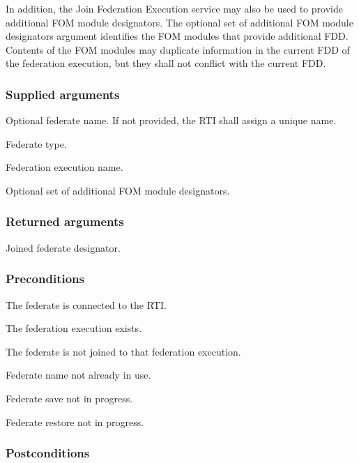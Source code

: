 In addition, the Join Federation Execution service may also be used to provide additional FOM module designators. The optional set of additional FOM module designators argument identifies the FOM modules that provide additional FDD. Contents of the FOM modules may duplicate information in the current FDD of the federation execution, but they shall not conflict with the current FDD.

\subsubsection{Supplied arguments}

\begin{stdalphalist}
    \item Optional federate name. If not provided, the RTI shall assign a unique name.
    \item Federate type.
    \item Federation execution name.
    \item Optional set of additional FOM module designators.
\end{stdalphalist}

\subsubsection{Returned arguments}

\begin{stdalphalist}
    \item Joined federate designator.
\end{stdalphalist}

\subsubsection{Preconditions}

\begin{stdalphalist}
    \item The federate is connected to the RTI.
    \item The federation execution exists.
    \item The federate is not joined to that federation execution.
    \item Federate name not already in use.
    \item Federate save not in progress.
    \item Federate restore not in progress.
\end{stdalphalist}

\subsubsection{Postconditions}

